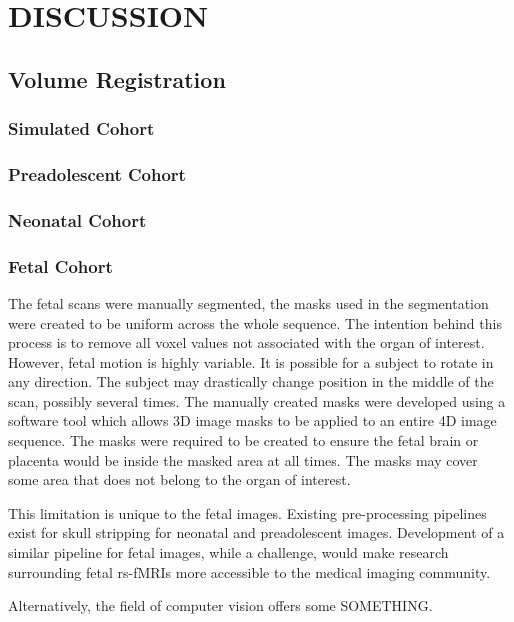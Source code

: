 \chapter{DISCUSSION}
\label{ch:discussion}

\section{Volume Registration}

\subsection{Simulated Cohort}

\subsection{Preadolescent Cohort}

\subsection{Neonatal Cohort}

\subsection{Fetal Cohort}

The fetal scans were manually segmented, the masks used in the segmentation were created to be uniform across the whole sequence. The intention behind this process is to remove all voxel values not associated with the organ of interest. However, fetal motion is highly variable. It is possible for a subject to rotate in any direction. The subject may drastically change position in the middle of the scan, possibly several times. The manually created masks were developed using a software tool which allows 3D image masks to be applied to an entire 4D image sequence. The masks were required to be created to ensure the fetal brain or placenta would be inside the masked area at all times. The masks may cover some area that does not belong to the organ of interest.

This limitation is unique to the fetal images. Existing pre-processing pipelines exist for skull stripping for neonatal and preadolescent images. Development of a similar pipeline for fetal images, while a challenge, would make research surrounding fetal rs-fMRIs more accessible to the medical imaging community.

Alternatively, the field of computer vision offers some SOMETHING.


